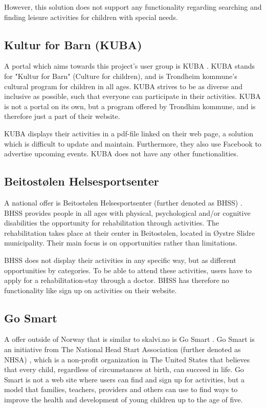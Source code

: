 However, this solution does not support any functionality regarding searching and finding leisure activities for children with special needs.

\subsection{Kultur for Barn (KUBA)}
A portal which aims towards this project's user group is KUBA \cite{KUBA}. KUBA stands for "Kultur for Barn" (Culture for children), and is Trondheim kommune's cultural program for children in all ages. KUBA strives to be as diverse and inclusive as possible, such that everyone can participate in their activities. KUBA is not a portal on its own, but a program offered by Trondhim kommune, and is therefore just a part of their website.

KUBA displays their activities in a pdf-file linked on their web page, a solution which is difficult to update and maintain. Furthermore, they also use Facebook to advertise upcoming events. KUBA does not have any other functionalities.

\subsection{Beitostølen Helsesportsenter}
A national offer is Beitostølen Helsesportsenter (further denoted as BHSS) \cite{BHSS}. BHSS provides people in all ages with physical, psychological and/or cognitive disabilities the opportunity for rehabilitation through activities. The rehabilitation takes place at their center in Beitostølen, located in Øystre Slidre municipality. Their main focus is on opportunities rather than limitations.  

BHSS does not display their activities in any specific way, but as different opportunities by categories. To be able to attend these activities, users have to apply for a rehabilitation-stay through a doctor. BHSS has therefore no functionality like sign up on activities on their website.  

\subsection{Go Smart}
A offer outside of Norway that is similar to skalvi.no is Go Smart \cite{GoSart}. Go Smart is an initiative from The National Head Start Association (further denoted as NHSA) \cite{NHSA}, which is a non-profit organization in The United States that believes that every child, regardless of circumstances at birth, can succeed in life. Go Smart is not a web site where users can find and sign up for activities, but a model that families, teachers, providers and others can use to find ways to improve the health and development of young children up to the age of five.

